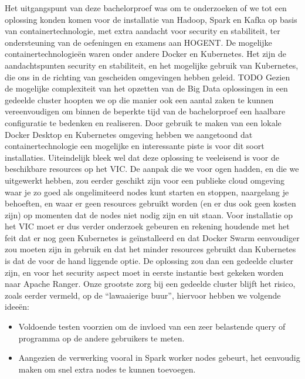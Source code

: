 Het uitgangspunt van deze bachelorproef was om te onderzoeken of we tot een oplossing konden komen voor de installatie van Hadoop, Spark en Kafka op basis van containertechnologie, met extra aandacht voor security en stabiliteit, ter ondersteuning van de oefeningen en examens aan HOGENT.
\newline
De mogelijke containertechnologieën waren onder andere Docker en Kubernetes.
\newline
\newline
Het zijn de aandachtspunten security en stabiliteit, en het mogelijke gebruik van Kubernetes, die ons in de richting van gescheiden omgevingen hebben geleid. TODO Gezien de mogelijke complexiteit van het opzetten van de Big Data oplossingen in een gedeelde cluster hoopten we op die manier ook een aantal zaken te kunnen vereenvoudigen om binnen de beperkte tijd van de bachelorproef een haalbare configuratie te bedenken en realiseren.
\newline
\newline
Door gebruik te maken van een lokale Docker Desktop en Kubernetes omgeving hebben we aangetoond dat containertechnologie een mogelijke en interessante piste is voor dit soort installaties.
\newline
Uiteindelijk bleek wel dat deze oplossing te veeleisend is voor de beschikbare resources op het VIC. De aanpak die we voor ogen hadden, en die we uitgewerkt hebben, zou eerder geschikt zijn voor een publieke cloud omgeving waar je zo goed als ongelimiteerd nodes kunt starten en stoppen, naargelang je behoeften, en waar er geen resources gebruikt worden (en er dus ook geen kosten zijn) op momenten dat de nodes niet nodig zijn en uit staan.
\newline
\newline
Voor installatie op het VIC moet er dus verder onderzoek gebeuren en rekening houdende met het feit dat er nog geen Kubernetes is geïnstalleerd en dat Docker Swarm eenvoudiger zou moeten zijn in gebruik en dat het minder resources gebruikt dan Kubernetes is dat de voor de hand liggende optie.
\newline
De oplossing zou dan een gedeelde cluster zijn, en voor het security aspect moet in eerste instantie best gekeken worden naar Apache Ranger.
\newline
Onze grootste zorg bij een gedeelde cluster blijft het risico, zoals eerder vermeld, op de ``lawaaierige buur'', hiervoor hebben we volgende ideeën:
\newline
\begin{itemize}
    \item Voldoende testen voorzien om de invloed van een zeer belastende query of programma op de andere gebruikers te meten.
    \item Aangezien de verwerking vooral in Spark worker nodes gebeurt, het eenvoudig maken om snel extra nodes te kunnen toevoegen.
\end{itemize}

